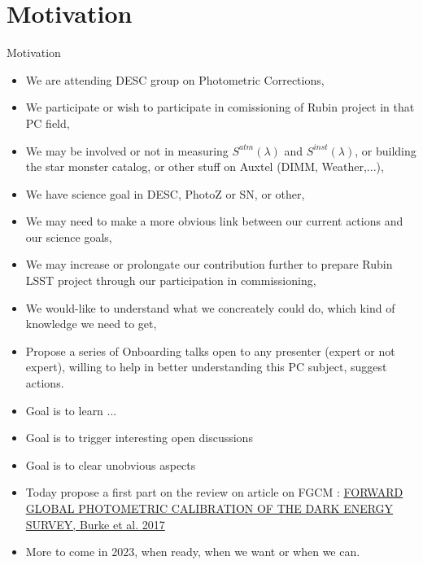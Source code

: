 \documentclass{beamer}
\begin{document}
\section{Motivation}
\begin{frame}\sectionpage\end{frame}


\begin{frame}{Motivation}
\begin{itemize}
\item We are attending DESC group on Photometric Corrections,
\item We participate or wish to participate in comissioning of Rubin project in that PC field, 
\item We may be involved or not in measuring $S^{atm}(\lambda)$ and $S^{inst}(\lambda)$, or building the star monster catalog, or other stuff on Auxtel (DIMM, Weather,...),
\item We have science goal in DESC, PhotoZ or SN, or other,
\item We may need to make a more obvious link between our current actions and our science goals,
\item We may increase or prolongate our contribution further to prepare Rubin LSST project through our participation in commissioning,
\item We would-like to understand what we concreately could do, which kind of knowledge we need to get,
\end{itemize}
\end{frame}

\begin{frame}
\begin{itemize}
\item Propose a series of Onboarding talks open to any presenter (expert or not expert), willing to help in better understanding this PC subject, suggest actions.
\item Goal is to learn ...
\item Goal is to trigger interesting open discussions
\item Goal is to clear unobvious aspects
\item Today propose a first part on the review on article on FGCM : \href{https://arxiv.org/abs/1706.01542}{FORWARD GLOBAL PHOTOMETRIC CALIBRATION OF THE DARK ENERGY SURVEY, Burke et al. 2017}
\item More to come in 2023, when ready, when we want or when we can.
\end{itemize}
\end{frame}
\end{document}
